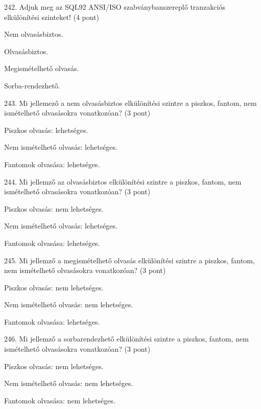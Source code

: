 \documentclass[a4paper,11.5pt, table]{article}
\begin{document}
242. Adjuk meg az SQL92 ANSI/ISO szabványbanszereplő tranzakciós elkülönítési szinteket! (4 pont)
	\begin{compactitem}
		\item Nem olvasásbiztos.
		\item Olvasásbiztos.
		\item Megismételhető olvasás.
		\item Sorba-rendezhető.
	\end{compactitem}

243. Mi jellemező a nem olvasásbiztos elkülönítési szintre a piszkos, fantom, nem ismételhető olvasásokra vonatkozóan? (3 pont)
	\begin{compactitem}
		\item Piszkos olvasás: lehetséges.
		\item Nem ismételhető olvasás: lehetséges.
		\item Fantomok olvasása: lehetséges.
	\end{compactitem}

244. Mi jellemző az olvasásbiztos elkülönítési szintre a piszkos, fantom, nem ismételhető olvasásokra vonatkozóan? (3 pont)
	\begin{compactitem}
		\item Piszkos olvasás: nem lehetséges.
		\item Nem ismételhető olvasás: lehetséges.
		\item Fantomok olvasása: lehetséges.
	\end{compactitem}

245. Mi jellemző a megismételhető olvasás elkülönítési szintre a piszkos, fantom, nem ismételhető olvasásokra vonatkozóan? (3 pont)
	\begin{compactitem}
	\item Piszkos olvasás: nem lehetséges.
	\item Nem ismételhető olvasás: nem lehetséges.
	\item Fantomok olvasása: lehetséges.
\end{compactitem}

246. Mi jellemző a sorbarendezhető elkülönítési szintre a piszkos, fantom, nem ismételhető olvasásokra vonatkozóan? (3 pont)
	\begin{compactitem}
	\item Piszkos olvasás: nem lehetséges.
	\item Nem ismételhető olvasás: nem lehetséges.
	\item Fantomok olvasása: nem lehetséges.
\end{compactitem}
\end{document}

